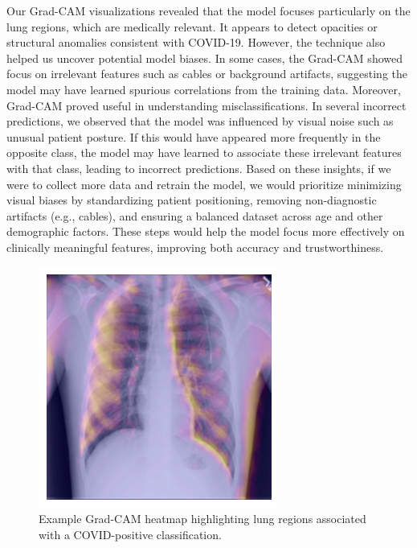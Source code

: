 \documentclass[conference]{IEEEtran}
\begin{document}
Our Grad-CAM visualizations revealed that the model focuses particularly on the lung regions, which are medically relevant. It appears to detect opacities or structural anomalies consistent with COVID-19. However, the technique also helped us uncover potential model biases. In some cases, the Grad-CAM showed focus on irrelevant features such as cables or background artifacts, suggesting the model may have learned spurious correlations from the training data. 
Moreover, Grad-CAM proved useful in understanding misclassifications. In several incorrect predictions, we observed that the model was influenced by visual noise such as unusual patient posture. If this would have appeared more frequently in the opposite class, the model may have learned to associate these irrelevant features with that class, leading to incorrect predictions. 
Based on these insights, if we were to collect more data and retrain the model, we would prioritize minimizing visual biases by standardizing patient positioning, removing non-diagnostic artifacts (e.g., cables), and ensuring a balanced dataset across age and other demographic factors. These steps would help the model focus more effectively on clinically meaningful features, improving both accuracy and trustworthiness.

\begin{figure}[h] \centering \includegraphics[width=0.8\columnwidth]{gradcam_example.png} \caption{Example Grad-CAM heatmap highlighting lung regions associated with a COVID-positive classification.} \label{fig:gradcam_example} \end{figure}
\end{document}
